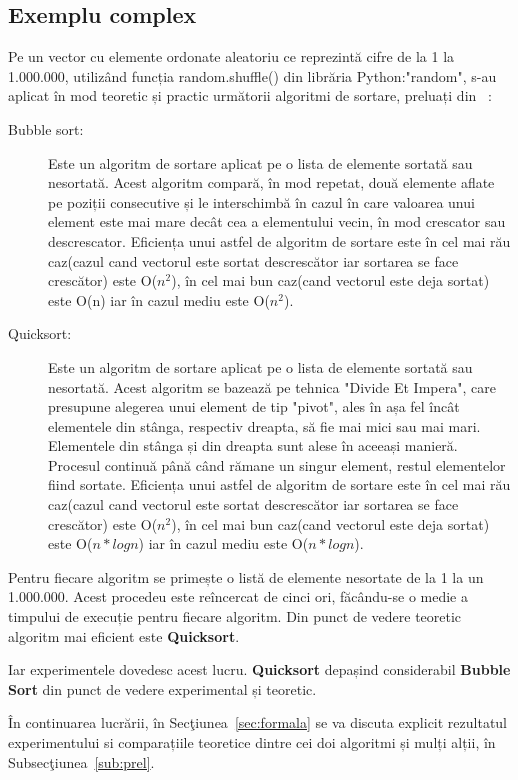 \documentclass[12pt]{article}
\begin{document}
\subsection{Exemplu complex}
Pe un vector cu elemente ordonate aleatoriu ce reprezintă cifre de la 1 la 1.000.000, utilizând funcția random.shuffle() din librăria Python:"random", s-au aplicat în mod teoretic și practic următorii algoritmi de sortare, preluați din ~\cite{ZAHARIE2008}:
\begin{description}
\item[Bubble sort:]  Este un algoritm de sortare aplicat pe o lista de elemente sortată sau nesortată. Acest algoritm compară, în mod repetat, două elemente aflate pe poziții consecutive și le interschimbă în cazul în care valoarea unui element este mai mare decât cea a elementului vecin, în mod crescator sau descrescator. Eficiența unui astfel de algoritm de sortare este în cel mai rău caz(cazul cand vectorul este sortat descrescător iar sortarea se face crescător) este O($n^2$), în cel mai bun caz(cand vectorul este deja sortat) este O(n) iar în cazul mediu este O($n^2$).
\item[Quicksort: ] Este un algoritm de sortare aplicat pe o lista de elemente sortată sau nesortată. Acest algoritm se bazează pe tehnica "Divide Et Impera",  care presupune alegerea unui element de tip "pivot", ales în așa fel încât elementele din stânga, respectiv dreapta, să fie mai mici sau mai mari. Elementele din stânga și din dreapta sunt alese în aceeași manieră. Procesul continuă până când rămane un singur element, restul elementelor fiind sortate. Eficiența unui astfel de algoritm de sortare este în cel mai rău caz(cazul cand vectorul este sortat descrescător iar sortarea se face crescător) este O($n^2$), în cel mai bun caz(cand vectorul este deja sortat) este O($n*log n$) iar în cazul mediu este O($n*log n$).
\end{description}
Pentru fiecare algoritm se primește o listă de elemente nesortate de la 1 la un 1.000.000. Acest procedeu este reîncercat de cinci ori, făcându-se o medie a timpului de execuție pentru fiecare algoritm. Din punct de vedere teoretic algoritm mai eficient este \textbf{Quicksort}. 
\pagebreak


Iar experimentele dovedesc acest lucru. \textbf{Quicksort} depașind considerabil \textbf{Bubble Sort} din punct de vedere experimental și teoretic.

În continuarea lucrării, în Secţiunea~\ref{sec:formala} se va discuta explicit rezultatul experimentului si comparațiile teoretice dintre cei doi algoritmi și mulți alții, în Subsecţiunea~\ref{sub:prel}.
\end{document}
